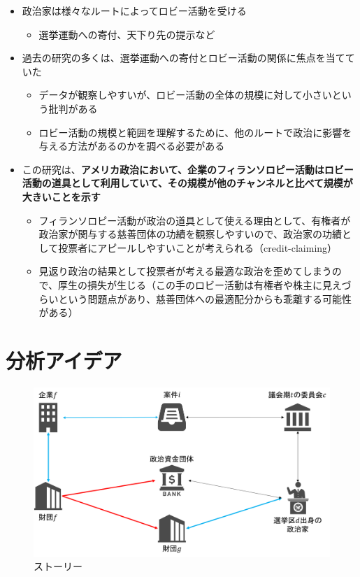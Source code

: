 \documentclass[../root]{subfiles}
\begin{document}
    \begin{itemize}
    
    \item
      政治家は様々なルートによってロビー活動を受ける

      \begin{itemize}
      
      \item
        選挙運動への寄付、天下り先の提示など
      \end{itemize}
    \item
      過去の研究の多くは、選挙運動への寄付とロビー活動の関係に焦点を当てていた

      \begin{itemize}
      
      \item
        データが観察しやすいが、ロビー活動の全体の規模に対して小さいという批判がある
      \item
        ロビー活動の規模と範囲を理解するために、他のルートで政治に影響を与える方法があるのかを調べる必要がある
      \end{itemize}
    \item
      この研究は、\textbf{アメリカ政治において、企業のフィランソロピー活動はロビー活動の道具として利用していて、その規模が他のチャンネルと比べて規模が大きいことを示す}

      \begin{itemize}
      
      \item
        フィランソロピー活動が政治の道具として使える理由として、有権者が政治家が関与する慈善団体の功績を観察しやすいので、政治家の功績として投票者にアピールしやすいことが考えられる（credit-claiming）
      \item
        見返り政治の結果として投票者が考える最適な政治を歪めてしまうので、厚生の損失が生じる（この手のロビー活動は有権者や株主に見えづらいという問題点があり、慈善団体への最適配分からも乖離する可能性がある）
      \end{itemize}
    \end{itemize}

    \section{分析アイデア}\label{ux5206ux6790ux30a2ux30a4ux30c7ux30a2}

    \begin{figure}
    \centering
    \includegraphics[width = .8\linewidth]{0911kato/92577460-a0e40a80-f2c5-11ea-8ecb-de283c56fa5b.png}
    \caption{ストーリー}
    \end{figure}
\end{document}
